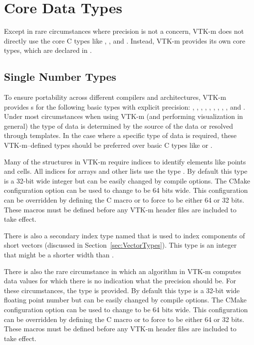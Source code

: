 \section{Core Data Types}
\label{sec:CoreDataTypes}

Except in rare circumstances where precision is not a concern, VTK-m does
not directly use the core C types like , ,
and . Instead, VTK-m provides its own core types, which
are declared in .

\subsection{Single Number Types}

To ensure portability across different compilers and architectures, VTK-m
provides s for the following basic types with explicit
precision: , , , ,
, , , , , and
. Under most circumstances when using VTK-m (and performing
visualization in general) the type of data is determined by the source of the
data or resolved through templates. In the case where a specific type of
data is required, these VTK-m--defined types should be preferred over basic
C types like  or .

Many of the structures in VTK-m require indices to identify elements like
points and cells. All indices for arrays and other lists use the type
. By default this type is a 32-bit wide integer but can be easily
changed by compile options. The CMake configuration option
 can be used to change  to be 64
bits wide. This configuration can be overridden by defining the C macro
 or  to
force  to be either 64 or 32 bits. These macros must be defined
before any VTK-m header files are included to take effect.

There is also a secondary index type named  that is used
to index components of short vectors (discussed in
Section~\ref{sec:VectorTypes}). This type is an integer that might be a
shorter width than .

There is also the rare circumstance in which an algorithm in VTK-m computes
data values for which there is no indication what the precision should
be. For these circumstances, the type  is provided. By
default this type is a 32-bit wide floating point number but can be easily
changed by compile options. The CMake configuration option
 can be used to change
 to be 64 bits wide. This configuration can be
overridden by defining the C macro 
or  to force  to
be either 64 or 32 bits. These macros must be defined before any VTK-m
header files are included to take
effect.

